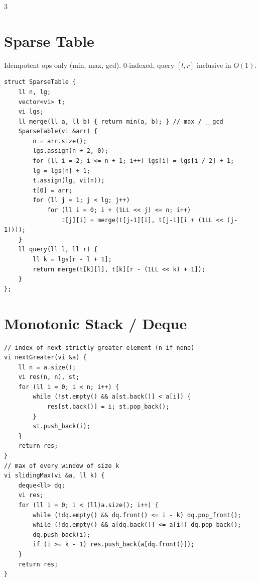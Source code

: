 \documentclass[10pt]{article}
\newcommand{\csection}[1]{\section{\textcolor{addc}{#1}}}
\newcommand{\cnote}[1]{{\scriptsize\color{addc} #1}\par}
\begin{document}
\begin{multicols*}{3}
\csection{Sparse Table}
\cnote{Idempotent ops only (min, max, gcd). 0-indexed, query $[l,r]$ inclusive in $O(1)$.}
\begin{lstlisting}[style=cppnew]
struct SparseTable {
    ll n, lg;
    vector<vi> t;
    vi lgs;
    ll merge(ll a, ll b) { return min(a, b); } // max / __gcd
    SparseTable(vi &arr) {
        n = arr.size();
        lgs.assign(n + 2, 0);
        for (ll i = 2; i <= n + 1; i++) lgs[i] = lgs[i / 2] + 1;
        lg = lgs[n] + 1;
        t.assign(lg, vi(n));
        t[0] = arr;
        for (ll j = 1; j < lg; j++)
            for (ll i = 0; i + (1LL << j) <= n; i++)
                t[j][i] = merge(t[j-1][i], t[j-1][i + (1LL << (j-1))]);
    }
    ll query(ll l, ll r) {
        ll k = lgs[r - l + 1];
        return merge(t[k][l], t[k][r - (1LL << k) + 1]);
    }
};
\end{lstlisting}

\csection{Monotonic Stack / Deque}
\begin{lstlisting}[style=cppnew]
// index of next strictly greater element (n if none)
vi nextGreater(vi &a) {
    ll n = a.size();
    vi res(n, n), st;
    for (ll i = 0; i < n; i++) {
        while (!st.empty() && a[st.back()] < a[i]) {
            res[st.back()] = i; st.pop_back();
        }
        st.push_back(i);
    }
    return res;
}
// max of every window of size k
vi slidingMax(vi &a, ll k) {
    deque<ll> dq;
    vi res;
    for (ll i = 0; i < (ll)a.size(); i++) {
        while (!dq.empty() && dq.front() <= i - k) dq.pop_front();
        while (!dq.empty() && a[dq.back()] <= a[i]) dq.pop_back();
        dq.push_back(i);
        if (i >= k - 1) res.push_back(a[dq.front()]);
    }
    return res;
}
\end{lstlisting}


\end{multicols*}
\end{document}
